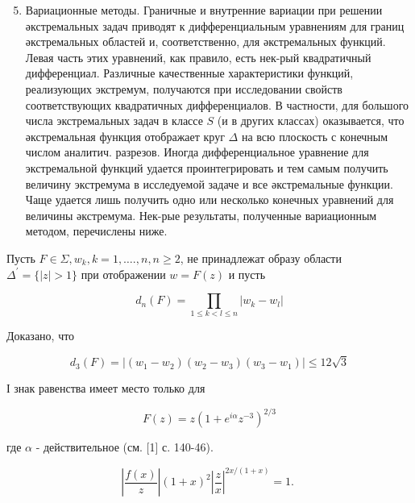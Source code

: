 \documentclass[10pt]{article}
\begin{document}
\begin{enumerate}

  \setcounter{enumi}{4}

  \item Вариационные методы. Граничные и внутренние вариации при решении әкстремальных задач приводят к дифференциальным уравнениям для границ әкстремальных областей и, соответственно, для әкстремальных функций. Левая часть этих уравнений, как правило, есть нек-рый квадратичный дифференциал. Различные качественные характеристики функций, реализующих экстремум, получаются при исследовании свойств соответствующих квадратичных дифференциалов. В частности, для большого числа экстремальных задач в классе $S$ (и в других классах) оказывается, что әкстремальная функция отображает круг $\Delta$ на всю плоскость с конечным числом аналитич. разрезов. Иногда дифференциальное уравнение для экстремальной функций удается проинтегрировать и тем самым получить величину экстремума в исследуемой задаче и все әкстремальные функции. Чаще удается лишь получить одно или несколько конечных уравнений для величины әкстремума. Нек-рые результаты, полученные вариационным методом, перечислены ниже.

\end{enumerate}



Пусть $F \in \Sigma, w_{k}, k=1, \ldots ., n, n \geqslant 2$, не принадлежат образу области $\Delta^{\prime}=\{|z|>1\}$ при отображении $w=F(z)$ и пусть



\[

d_{n}(F)=\prod_{1 \leqslant k<l \leqslant n}\left|w_{k}-w_{l}\right|

\]



Доказано, что



\[

d_{3}(F)=\left|\left(w_{1}-w_{2}\right)\left(w_{2}-w_{3}\right)\left(w_{3}-w_{1}\right)\right| \leqslant 12 \sqrt{3}

\]



І знак равенства имеет место только для



\[

F(z)=z\left(1+e^{i \alpha} z^{-3}\right)^{2 / 3}

\]



где $\alpha$ - действительное (см. [1] с. 140-46).



\[

\left|\frac{f(x)}{z}\right|(1+x)^{2}\left|\frac{z}{x}\right|^{2 x /(1+x)}=1 \text {. }

\]
\end{document}
